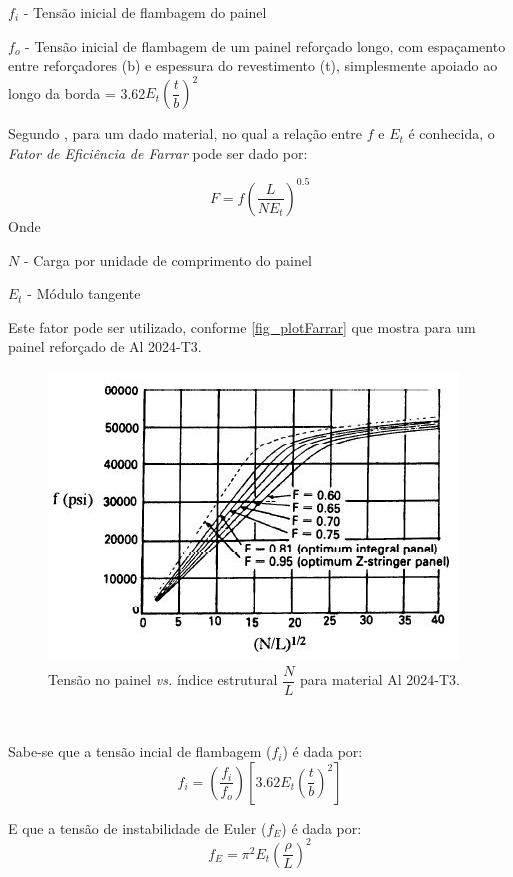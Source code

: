 $f_i$ - Tensão inicial de flambagem do painel\

$f_o$ - Tensão inicial de flambagem de um painel reforçado longo, com espaçamento entre reforçadores (b) e espessura do revestimento (t), simplesmente apoiado ao longo da borda = 3.62$E_t$$(\dfrac{t}{b})^2$\

Segundo \cite{niu1997airframe}, para um dado material, no qual a relação entre $f$ e $E_t$ é conhecida, o \emph{Fator de Eficiência de Farrar} pode ser dado por:

\begin{equation} \label{Farrar}
F = f(\dfrac{L}{N E_t})^{0.5}
\end{equation}
Onde

$N$ - Carga por unidade de comprimento do painel\

$E_t$ - Módulo tangente

Este fator pode ser utilizado, conforme \autoref{fig_plotFarrar} que mostra para um painel reforçado de Al 2024-T3.

\begin{figure}[h]
	\caption{\label{fig_plotFarrar}Tensão no painel \emph{vs.} índice estrutural $\dfrac{N}{L}$ para material Al 2024-T3.}
  \centering
  \includegraphics[scale=1.0]{figura/PlotFarrar}
\end{figure}
\

Sabe-se que a tensão incial de flambagem ($f_i$) é dada por:
\begin{equation} \label{InitialBuck}
f_i = (\dfrac{f_i}{f_o})[{3.62E_t(\dfrac{t}{b})^2}]
\end{equation}

E que a tensão de instabilidade de Euler ($f_E$) é dada por:
\begin{equation} \label{InitialEuler}
f_E = {\pi^2}E_t(\dfrac{\rho}{L})^2
\end{equation}

